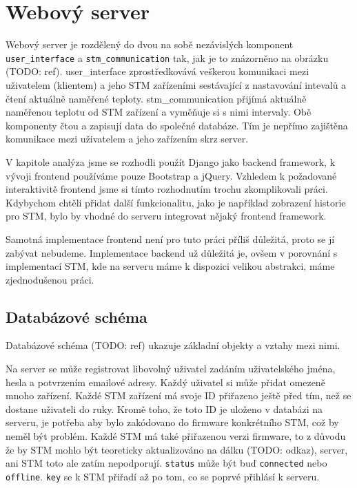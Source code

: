 
\section{Webový server}


Webový server je rozdělený do dvou na sobě nezávislých komponent \texttt{user\_interface} a
\texttt{stm\_communication} tak, jak je to znázorněno na obrázku (TODO: ref).
user_interface zprostředkovává veškerou komunikaci mezi uživatelem (klientem) a jeho STM
zařízeními sestávající z nastavování intevalů a čtení aktuálně naměřené teploty.
stm_communication přijímá aktuálně naměřenou teplotu od STM zařízení a vyměňuje si s nimi intervaly.
Obě komponenty čtou a zapisují data do společné databáze.
Tím je nepřímo zajištěna komunikace mezi uživatelem a jeho zařízením skrz server.

V kapitole analýza jsme se rozhodli použít Django jako backend framework, k vývoji frontend
používáme pouze Bootstrap a jQuery.
Vzhledem k požadované interaktivitě frontend jsme si tímto rozhodnutím trochu zkomplikovali práci.
Kdybychom chtěli přidat další funkcionalitu, jako je například zobrazení historie pro STM,
bylo by vhodné do serveru integrovat nějaký frontend framework.

Samotná implementace frontend není pro tuto práci příliš důležitá, proto se jí zabývat nebudeme.
Implementace backend už důležitá je, ovšem v porovnání s implementací STM, kde na serveru máme
k dispozici velikou abstrakci, máme zjednodušenou práci.

\subsection{Databázové schéma}


Databázové schéma (TODO: ref) ukazuje základní objekty a vztahy mezi nimi.

Na server se může registrovat libovolný uživatel zadáním uživatelského jména, hesla a potvrzením
emailové adresy.
Každý uživatel si může přidat omezeně mnoho zařízení.
Každé STM zařízení má svoje ID přiřazeno ještě před tím, než se dostane uživateli do ruky.
Kromě toho, že toto ID je uloženo v databázi na serveru, je potřeba aby bylo zakódovano do firmware
konkrétního STM, což by neměl být problém.
Každé STM má také přiřazenou verzi firmware, to z důvodu že by STM mohlo být teoreticky aktualizováno
na dálku (TODO: odkaz), server, ani STM toto ale zatím nepodporují.
\texttt{status} může být buď \texttt{connected} nebo \texttt{offline}.
\texttt{key} se k STM přiřadí až po tom, co se poprvé přihlásí k serveru.

